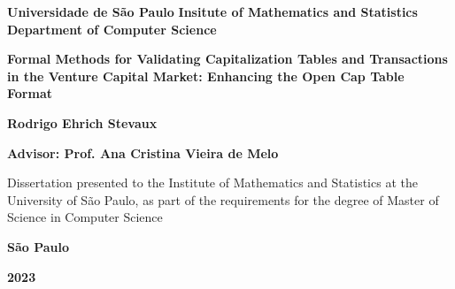 \begin{titlepage}
\begin{center}

\vspace*{1cm}

\vspace{1cm}

\textbf{Universidade de São Paulo}
\textbf{Insitute of Mathematics and Statistics}
\textbf{Department of Computer Science}

\vspace{2cm}
\textbf{\LARGE Formal Methods for Validating Capitalization Tables and Transactions in the Venture Capital Market: Enhancing the Open Cap Table Format}

\vspace{2cm}

\textbf{\Large Rodrigo Ehrich Stevaux}

\vspace{1cm}

\textbf{\Large Advisor: Prof. Ana Cristina Vieira de Melo}

\vspace{3cm}
\begin{flushright}
\begin{minipage}{0.5\textwidth}
\begin{flushleft}
Dissertation presented to the Institute of Mathematics and Statistics at the University of São Paulo, as part of the requirements for the degree of Master of Science in Computer Science
\end{flushleft}
\end{minipage}
\end{flushright}

\vfill
\textbf{\large São Paulo}

\vspace{0.5cm}
\textbf{\large 2023}

\end{center}
\end{titlepage}